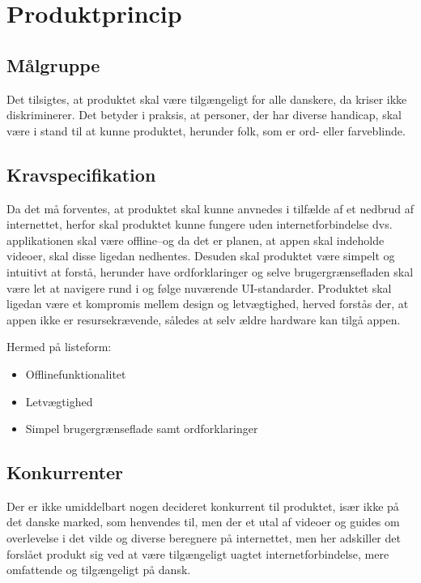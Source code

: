\section{Produktprincip}
\subsection{Målgruppe}
Det tilsigtes, at produktet skal være tilgængeligt for alle danskere, da kriser ikke diskriminerer. Det betyder i praksis, at personer, der har diverse handicap, skal være i stand til at kunne produktet, herunder folk, som er ord- eller farveblinde.
\subsection{Kravspecifikation}
Da det må forventes, at produktet skal kunne anvnedes i tilfælde af et nedbrud af internettet, herfor skal produktet kunne fungere uden internetforbindelse dvs. applikationen skal være offline--og da det er planen, at appen skal indeholde videoer, skal disse ligedan nedhentes.
Desuden skal produktet være simpelt og intuitivt at forstå, herunder have ordforklaringer og selve brugergrænsefladen skal være let at navigere rund i og følge nuværende UI-standarder.
Produktet skal ligedan være et kompromis mellem design og letvægtighed, herved forstås der, at appen ikke er resursekrævende, således at selv ældre hardware kan tilgå appen.

Hermed på listeform:
\begin{itemize}
    \item Offlinefunktionalitet
    \item Letvægtighed
    \item Simpel brugergrænseflade samt ordforklaringer
\end{itemize}

\subsection{Konkurrenter}
Der er ikke umiddelbart nogen decideret konkurrent til produktet, især ikke på det danske marked, som henvendes til, men der et utal af videoer og guides om overlevelse i det vilde og diverse beregnere på internettet, men her adskiller det forslået produkt sig ved at være tilgængeligt uagtet internetforbindelse, mere omfattende og tilgængeligt på dansk.